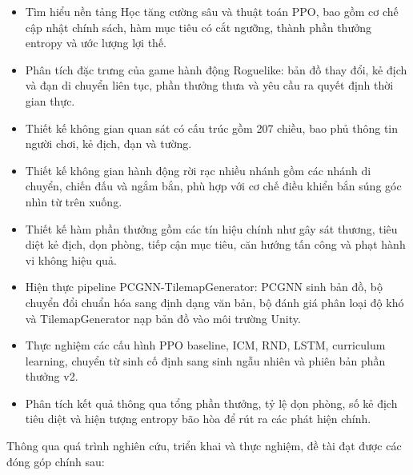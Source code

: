 \renewcommand{\labelitemi}{$-$}
\begin{itemize}
    \item Tìm hiểu nền tảng Học tăng cường sâu và thuật toán PPO, bao gồm cơ chế cập nhật chính sách, hàm mục tiêu có cắt ngưỡng, thành phần thưởng entropy và ước lượng lợi thế.
    \item Phân tích đặc trưng của game hành động Roguelike: bản đồ thay đổi, kẻ địch và đạn di chuyển liên tục, phần thưởng thưa và yêu cầu ra quyết định thời gian thực.
    \item Thiết kế không gian quan sát có cấu trúc gồm 207 chiều, bao phủ thông tin người chơi, kẻ địch, đạn và tường.
    \item Thiết kế không gian hành động rời rạc nhiều nhánh gồm các nhánh di chuyển, chiến đấu và ngắm bắn, phù hợp với cơ chế điều khiển bắn súng góc nhìn từ trên xuống.
    \item Thiết kế hàm phần thưởng gồm các tín hiệu chính như gây sát thương, tiêu diệt kẻ địch, dọn phòng, tiếp cận mục tiêu, căn hướng tấn công và phạt hành vi không hiệu quả.
    \item Hiện thực pipeline PCGNN-TilemapGenerator: PCGNN sinh bản đồ, bộ chuyển đổi chuẩn hóa sang định dạng văn bản, bộ đánh giá phân loại độ khó và TilemapGenerator nạp bản đồ vào môi trường Unity.
    \item Thực nghiệm các cấu hình PPO baseline, ICM, RND, LSTM, curriculum learning, chuyển từ sinh cố định sang sinh ngẫu nhiên và phiên bản phần thưởng v2.
    \item Phân tích kết quả thông qua tổng phần thưởng, tỷ lệ dọn phòng, số kẻ địch tiêu diệt và hiện tượng entropy bão hòa để rút ra các phát hiện chính.
\end{itemize}

\vspace{0.3cm}


Thông qua quá trình nghiên cứu, triển khai và thực nghiệm, đề tài đạt được các đóng góp chính sau:

